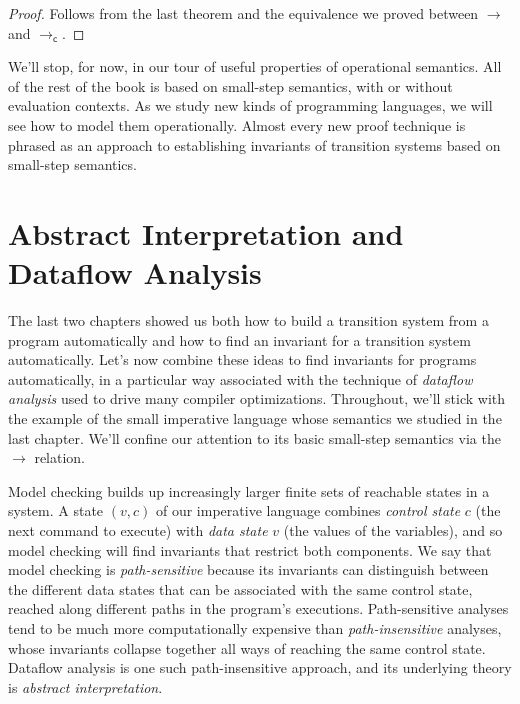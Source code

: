 \documentclass{amsbook}
\theoremstyle{definition}
\theoremstyle{remark}
\numberwithin{section}{chapter}
\numberwithin{equation}{chapter}
\begin{document}
\begin{proof}
  Follows from the last theorem and the equivalence we proved between $\to$ and $\to_\mathsf{c}$.
\end{proof}

We'll stop, for now, in our tour of useful properties of operational semantics.
All of the rest of the book is based on small-step semantics, with or without evaluation contexts.
As we study new kinds of programming languages, we will see how to model them operationally.
Almost every new proof technique is phrased as an approach to establishing invariants of transition systems based on small-step semantics.



\chapter{Abstract Interpretation and Dataflow Analysis}

The last two chapters showed us both how to build a transition system from a program automatically and how to find an invariant for a transition system automatically.
Let's now combine these ideas to find invariants for programs automatically, in a particular way associated with the technique of \emph{dataflow analysis} used to drive many compiler optimizations.
Throughout, we'll stick with the example of the small imperative language whose semantics we studied in the last chapter.
We'll confine our attention to its basic small-step semantics via the $\to$ relation.

Model checking builds up increasingly larger finite sets of reachable states in a system.
A state $(v, c)$ of our imperative language combines \emph{control state} $c$ (the next command to execute) with \emph{data state} $v$ (the values of the variables), and so model checking will find invariants that restrict both components.
We say that model checking is \emph{path-sensitive} because its invariants can distinguish between the different data states that can be associated with the same control state, reached along different paths in the program's executions.
Path-sensitive analyses tend to be much more computationally expensive than \emph{path-insensitive} analyses, whose invariants collapse together all ways of reaching the same control state.
Dataflow analysis is one such path-insensitive approach, and its underlying theory is \emph{abstract interpretation}.
\end{document}
